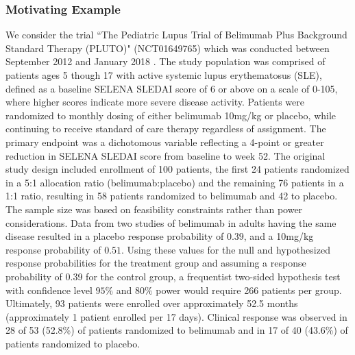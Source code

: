 \documentclass[12pt]{article}
\begin{document}
\subsubsection{Motivating Example}\label{sec:example2motivating}
We consider the trial ``The Pediatric Lupus Trial of Belimumab Plus Background Standard Therapy (PLUTO)" (NCT01649765) which was conducted between September 2012 and January 2018 \citep{Brunner2020}.
%
The study population was comprised of patients ages 5 though 17 with active systemic lupus erythematosus (SLE), defined as a baseline SELENA SLEDAI score of 6 or above on a scale of 0-105, where higher scores indicate more severe disease activity.
%
Patients were randomized to monthly dosing of either belimumab 10mg/kg or placebo, while continuing to receive standard of care therapy regardless of assignment.
%
The primary endpoint was a dichotomous variable reflecting a 4-point or greater reduction in SELENA SLEDAI score from baseline to week 52. 
%
The original study design included enrollment of 100 patients, the first 24 patients randomized in a 5:1 allocation ratio (belimumab:placebo) and the remaining 76 patients in a 1:1 ratio, resulting in 58 patients randomized to belimumab and 42 to placebo. 
%
The sample size was based on feasibility constraints rather than power considerations.
%
Data from two studies of belimumab in adults having the same disease resulted in a placebo response probability of $0.39$, and a 10mg/kg response probability of $0.51$. 
%
Using these values for the null and hypothesized response probabilities for the treatment group and assuming a response probability of 0.39 for the control group, a frequentist two-sided hypothesis test with confidence level $95\%$ and $80\%$ power would require 266 patients per group.
%
Ultimately, 93 patients were enrolled over approximately 52.5 months (approximately 1 patient enrolled per 17 days).
%
Clinical response was observed in 28 of 53 (52.8\%) of patients randomized to belimumab and in 17 of 40 (43.6\%) of patients randomized to placebo.
\end{document}
